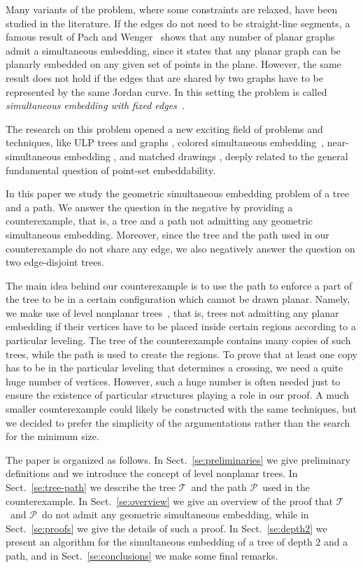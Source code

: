 \documentclass[a4paper,10pt]{llncs}
\newcommand{\T}{\mbox{$\mathcal T$ }}
\renewcommand{\P}{\mbox{$\mathcal P$ }}
\begin{document}
Many variants of the problem, where some constraints are relaxed, have been studied in the literature. If the edges do not need to be straight-line segments, a famous result of Pach and Wenger~\cite{pw-epgfvl-01} shows that any number of planar graphs admit a simultaneous embedding, since it states that any planar graph can be planarly embedded on any given set of points in the plane. However, the same result does not hold if the edges that are shared by two graphs have to be represented by the same Jordan curve. In this setting the problem is called {\it simultaneous embedding with fixed edges}~\cite{f-egsfe-06,gjpss-sgefe-06,fjks-crppgasefe-08}.

The research on this problem opened a new exciting field of problems and techniques, like ULP trees and graphs \cite{efk-culpt-06,fk-culpg-07,fk-mlnpt-07}, colored simultaneous embedding~\cite{g-csge-07}, near-simultaneous embedding \cite{fkk-csnse-07}, and matched drawings \cite{gdkls-mdpg-07}, deeply
related to the general fundamental question of point-set embeddability.

In this paper we study the geometric simultaneous embedding problem of a tree and a path. We answer the question in the negative by providing a counterexample, that is, a tree and a path not admitting any geometric simultaneous embedding. Moreover, since the tree and the path used in our counterexample do not share any edge, we also negatively answer the question on two edge-disjoint trees.

The main idea behind our counterexample is to use the path to enforce a part of the tree to be in a certain configuration which cannot be drawn planar. Namely, we make use of level nonplanar trees~\cite{efk-culpt-06,fk-mlnpt-07}, that is, trees not admitting any planar embedding if their vertices have to be placed inside certain regions according to a particular leveling. The tree of the counterexample contains many copies of such trees, while the path is used to create the regions. To prove that at least one copy has to be in the particular leveling that determines a crossing, we need a quite huge number of vertices. However, such a huge number is often needed just to ensure the existence of particular structures playing a role in our proof. A much smaller counterexample could likely be constructed with the same techniques, but we decided to prefer the simplicity of the argumentations rather than the search for the minimum size.

The paper is organized as follows. In Sect.~\ref{se:preliminaries} we give preliminary definitions and we introduce the concept of level nonplanar trees. In Sect.~\ref{se:tree-path} we describe the tree \T and the path \P used in the counterexample. In Sect.~\ref{se:overview} we give an overview of the proof that \T and \P do not admit any geometric simultaneous embedding, while in Sect.~\ref{se:proofs} we give the details of such a proof. In Sect.~\ref{se:depth2} we present an algorithm for the simultaneous embedding of a tree of depth $2$ and a path, and in Sect.~\ref{se:conclusions} we make some final remarks.
\end{document}
